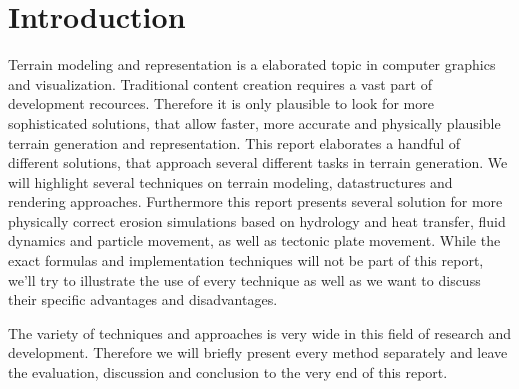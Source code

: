 \section{Introduction}
Terrain modeling and representation is a elaborated topic in computer graphics and visualization. Traditional content creation requires a vast part of development recources. Therefore it is only plausible to look for more sophisticated solutions, that allow faster, more accurate and physically plausible terrain generation and representation. This report elaborates a handful of different solutions, that approach several different tasks in terrain generation. 
We will highlight several techniques on terrain modeling, datastructures and rendering approaches. 
Furthermore this report presents several solution for more physically correct erosion simulations based on hydrology and heat transfer, fluid dynamics and particle movement, as well as tectonic plate movement. While the exact formulas  and implementation techniques will not be part of this report, we'll try to illustrate the use of every technique as well as we want to discuss their specific advantages and disadvantages.

The variety of techniques and approaches is very wide in this field of research and development. Therefore we will briefly present every method separately and leave the evaluation, discussion and conclusion to the very end of this report.



